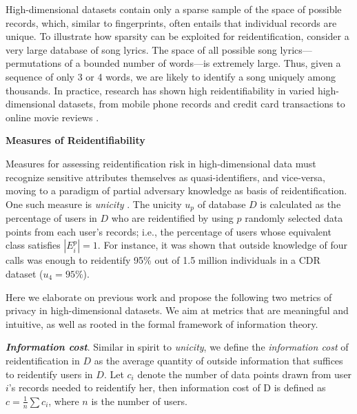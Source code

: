 \documentclass[12pt]{article}
\begin{document}
High-dimensional datasets contain only a sparse sample of the space of possible records, which, similar to fingerprints, often entails that individual records are unique. To illustrate how sparsity can be exploited for reidentification, consider a very large database of song lyrics. The space of all possible song lyrics---permutations of a bounded number of words---is extremely large. Thus, given a sequence of only 3 or 4 words, we are likely to identify a song uniquely among thousands. In practice, research has shown high reidentifiability in varied high-dimensional datasets, from mobile phone records and credit card transactions to online movie reviews \cite{de2013unique,de2015unique,narayanan2008robust}.


\vspace{.3cm}
\noindent\textbf{\normalsize{Measures of Reidentifiability}}
\vspace{.2cm}

\iffalse High dimensionality renders \textit{k-anonymity} and similar approaches inappropriate for reidentification analysis \cite{noriega2015balancing}.\fi

\noindent Measures for assessing reidentification risk in high-dimensional data must recognize sensitive attributes themselves as quasi-identifiers, and vice-versa, moving to a paradigm of partial adversary knowledge as basis of reidentification. One such measure is \textit{unicity} \cite{de2013unique}. The unicity $u_p$ of database $D$ is calculated as the percentage of users in $D$ who are reidentified by using $p$ randomly selected data points from each user's records; i.e., the percentage of users whose equivalent class satisfies $|E_i^p|=1$. For instance, it was shown that outside knowledge of four calls was enough to reidentify 95\% out of 1.5 million individuals in a CDR dataset ($u_{4}=95\%$).

Here we elaborate on previous work and propose the following two metrics of privacy in high-dimensional datasets. We aim at metrics that are meaningful and intuitive, as well as rooted in the formal framework of information theory.

\vspace{.2cm}
\textbf{\textit{Information cost}}. Similar in spirit to \textit{unicity}, we define the \textit{information cost} of reidentification in $D$ as the average quantity of outside information that suffices to reidentify users in $D$. Let $c_i$ denote the number of data points drawn from user $i$'s records needed to reidentify her, then information cost of D is defined as $c = \frac{1}{n} \sum c_i$, where $n$ is the number of users.
\end{document}
